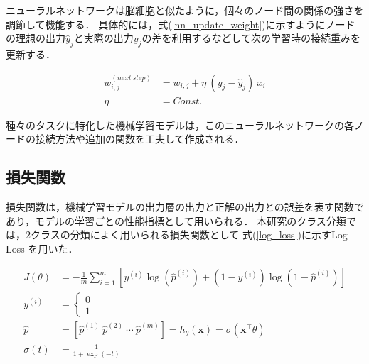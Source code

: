 \documentclass[12pt,a4j]{jreport}
\begin{document}
ニューラルネットワークは脳細胞と似たように，個々のノード間の関係の強さを調節して機能する．
具体的には，式(\ref{nn_update_weight})に示すようにノードの理想の出力$\hat{y}_j$と実際の出力$y_j$の差を利用するなどして次の学習時の接続重みを更新する．

\begin{align}
  w_{i, j}^{(next~ step)} &= w_{i, j} + \eta~ (y_j - \hat{y}_j)~ x_i
  \label{nn_update_weight}
  \\
  \eta &= Const.
  \label{nn_learning_rate}
\end{align}

種々のタスクに特化した機械学習モデルは，このニューラルネットワークの各ノードの接続方法や追加の関数を工夫して作成される．

\subsection{損失関数}
損失関数は，機械学習モデルの出力層の出力と正解の出力との誤差を表す関数であり，モデルの学習ごとの性能指標として用いられる\cite{aurellen20}．
本研究のクラス分類では，2クラスの分類によく用いられる損失関数として
式(\ref{log_loss})に示すLog Loss
を用いた．



\begin{align}
  J(\theta)&=-\frac{1}{m} \sum_{i=1}^{m}\left[y^{(i)} \log \left(\hat{p}^{(i)}\right)+\left(1-y^{(i)}\right) \log \left(1-\hat{p}^{(i)}\right)\right]
  \label{log_loss}
  \\
  y^{(i)}&=\left\{
    \begin{array}{l}
      0 \\
      1 
    \end{array}
  \right.
  \label{logistic_predict}
  \\
  \hat{p}
  &=\left[ \hat{p}^{(1)}~ \hat{p}^{(2)}~ \cdots~ \hat{p}^{(m)} \right]
  =h_{\theta}(\mathbf{x})
  =\sigma\left(\mathbf{x}^{\top} \theta\right)
  \label{logistic_probability}
  \\
  \sigma(t)&=\frac{1}{1+\exp (-t)}
  \label{sigmoid}
\end{align}
\end{document}
